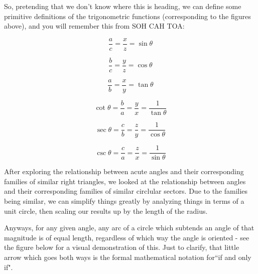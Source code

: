 \documentclass{article}
\begin{document}
\vspace{10pt}

So, pretending that we don't know where this is heading, we can define some primitive definitions of the trigonometric functions (corresponding to the figures above), and you will remember this from SOH CAH TOA:

\[\frac{a}{c}=\frac{x}{z}=\sin\theta\]

\[\frac{b}{c}=\frac{y}{z}=\cos\theta\]

\[\frac{a}{b}=\frac{x}{y}=\tan\theta\]

\[\cot\theta=\frac{b}{a}=\frac{y}{x}=\frac{1}{\tan\theta}\]

\[\sec\theta=\frac{c}{b}=\frac{z}{y}=\frac{1}{\cos\theta}\]

\[\csc\theta=\frac{c}{a}=\frac{z}{x}=\frac{1}{\sin\theta}\]

\newpage

After exploring the relationship between acute angles and their corresponding families of similar right triangles, we looked at the relationship between angles and their corresponding families of similar circlular sectors. Due to the families being similar, we can simplify things greatly by analyzing things in terms of a unit circle, then scaling our results up by the length of the radius. 

\vspace{10pt}

Anyways, for any given angle, any arc of a circle which subtends an angle of that magnitude is of equal length, regardless of which way the angle is oriented - see the figure below for a visual demonstration of this. Just to clarify, that little arrow which goes both ways is the formal mathematical notation for``if and only if".

\begin{center}
\end{center}
\end{document}
